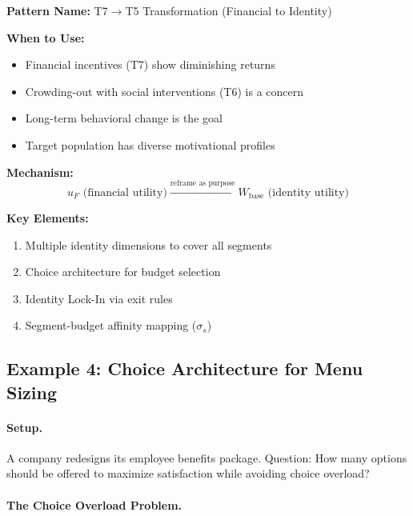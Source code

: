 \begin{tcolorbox}[colback=green!5!white, colframe=green!75!black,
    title=\textbf{Design Pattern: Type Transformation}]

\textbf{Pattern Name:} T7$\rightarrow$T5 Transformation (Financial to Identity)

\textbf{When to Use:}
\begin{itemize}[nosep]
    \item Financial incentives (T7) show diminishing returns
    \item Crowding-out with social interventions (T6) is a concern
    \item Long-term behavioral change is the goal
    \item Target population has diverse motivational profiles
\end{itemize}

\textbf{Mechanism:}
\begin{equation}
\boxed{u_F \text{ (financial utility)} \xrightarrow{\text{reframe as purpose}} W_{\text{base}} \text{ (identity utility)}}
\end{equation}

\textbf{Key Elements:}
\begin{enumerate}[nosep]
    \item Multiple identity dimensions to cover all segments
    \item Choice architecture for budget selection
    \item Identity Lock-In via exit rules
    \item Segment-budget affinity mapping ($\sigma_s$)
\end{enumerate}

\end{tcolorbox}


\subsection{Example 4: Choice Architecture for Menu Sizing}
\label{sec:hhh-example-choice-architecture}

\paragraph{Setup.} A company redesigns its employee benefits package. Question: How many options should be offered to maximize satisfaction while avoiding choice overload?

\paragraph{The Choice Overload Problem.}

